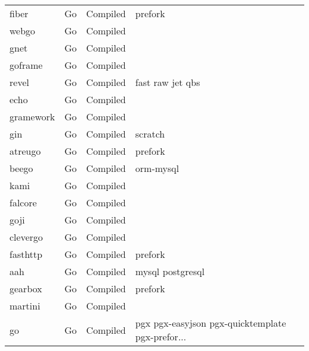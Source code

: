 \begin{longtable}{llll}
    fiber            & Go & Compiled         & prefork                                            \\
    webgo            & Go & Compiled         &                                                    \\
    gnet             & Go & Compiled         &                                                    \\
    goframe          & Go & Compiled         &                                                    \\
    revel            & Go & Compiled         & fast raw jet qbs                                   \\
    echo             & Go & Compiled         &                                                    \\
    gramework        & Go & Compiled         &                                                    \\
    gin              & Go & Compiled         & scratch                                            \\
    atreugo          & Go & Compiled         & prefork                                            \\
    beego            & Go & Compiled         & orm-mysql                                          \\
    kami             & Go & Compiled         &                                                    \\
    falcore          & Go & Compiled         &                                                    \\
    goji             & Go & Compiled         &                                                    \\
    clevergo         & Go & Compiled         &                                                    \\
    fasthttp         & Go & Compiled         & prefork                                            \\
    aah              & Go & Compiled         & mysql postgresql                                   \\
    gearbox          & Go & Compiled         & prefork                                            \\
    martini          & Go & Compiled         &                                                    \\
    go               & Go & Compiled         & pgx pgx-easyjson pgx-quicktemplate pgx-prefor...   \\

\end{longtable}
